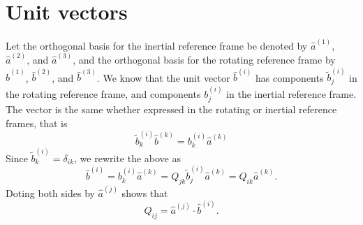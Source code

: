 \documentclass[oneside,a4paper,11pt]{report}
\begin{document}
\section{Unit vectors}
Let the orthogonal basis for the inertial reference frame be denoted by $\hat{a}^{(1)}$, $\hat{a}^{(2)}$, and $\hat{a}^{(3)}$, and the orthogonal basis for the rotating reference frame by $\hat{b}^{(1)}$, $\hat{b}^{(2)}$, and $\hat{b}^{(3)}$. We know that the unit vector $\hat{b}^{(i)}$ has components $\tilde{b}_j^{(i)}$ in the rotating reference frame, and components $b_j^{(i)}$ in the inertial reference frame. The vector is the same whether expressed in the rotating or inertial reference frames, that is
\begin{equation}
\tilde{b}_k^{(i)} \hat{b}^{(k)} = b_k^{(i)} \hat{a}^{(k)}
\end{equation}
Since $\tilde{b}_k^{(i)} = \delta_{ik}$, we rewrite the above as
\begin{equation}
\label{eq:unit_trans}
\hat{b}^{(i)} = b_k^{(i)} \hat{a}^{(k)} = Q_{jk} \tilde{b}_j^{(i)} \hat{a}^{(k)} = Q_{ik} \hat{a}^{(k)}.
\end{equation}
Doting both sides by $\hat{a}^{(j)}$ shows that 
\begin{equation}
Q_{ij} = \hat{a}^{(j)} \cdot \hat{b}^{(i)}.
\end{equation}
\end{document}
